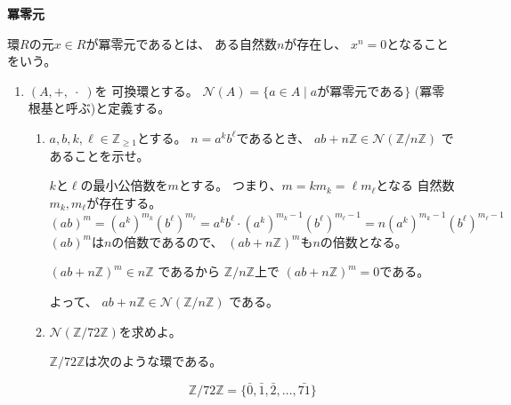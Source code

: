 \documentclass[12pt,b5paper]{ltjsarticle}
\begin{document}
\hrulefill

\textbf{冪零元}

環$R$の元$x\in R$が冪零元であるとは、
ある自然数$n$が存在し、
$x^{n}=0$となることをいう。

\hrulefill

\begin{enumerate}
 \item
      $(A, +, \;\cdot\;)$を
      可換環とする。
      $\mathcal{N} (A) = \{ a \in A \mid a が冪零元である \}$
      (冪零根基と呼ぶ)と定義する。
      \begin{enumerate}
       \item
            $a, b, k, \ell \in \mathbb{Z}_{\geq 1}$とする。
            $n = a^{k}b^{\ell}$であるとき、
            $ab + n\mathbb{Z} \in \mathcal{N}(\mathbb{Z}/n\mathbb{Z})$
            であることを示せ。

            \dotfill

            $k$と$\ell$の最小公倍数を$m$とする。
            つまり、$m=km_{k}=\ell m_{\ell}$となる
            自然数$m_{k},m_{\ell}$が存在する。
            \begin{equation}
             (ab)^{m} = (a^{k})^{m_{k}}(b^{\ell})^{m_{\ell}}
              = a^{k}b^{\ell} \cdot (a^{k})^{m_{k}-1}(b^{\ell})^{m_{\ell}-1}
              = n (a^{k})^{m_{k}-1}(b^{\ell})^{m_{\ell}-1}
            \end{equation}
            $(ab)^{m}$は$n$の倍数であるので、
            $\left(ab + n \mathbb{Z}\right)^{m}$も$n$の倍数となる。

            $\left(ab + n \mathbb{Z}\right)^{m} \in n\mathbb{Z}$
            であるから
            $\mathbb{Z}/n\mathbb{Z}$上で
            $\left(ab + n \mathbb{Z}\right)^{m}=0$である。

            よって、
            $ab + n\mathbb{Z} \in \mathcal{N}(\mathbb{Z}/n\mathbb{Z})$
            である。

            \hrulefill

       \item
            $\mathcal{N}(\mathbb{Z}/72\mathbb{Z})$を求めよ。

            \dotfill

            $\mathbb{Z}/72\mathbb{Z}$は次のような環である。
            
            \begin{equation}
             \mathbb{Z}/72\mathbb{Z}
              =\{\bar{0},\bar{1},\bar{2},\dots,\bar{71}\}
            \end{equation}


\end{enumerate}
\end{enumerate}
\end{document}
